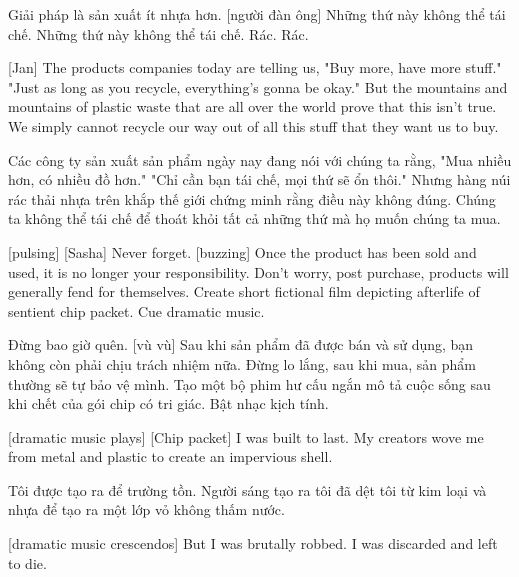 \documentclass[a4paper]{article}
\begin{document}
	\begin{vietnamese-v2}
		 Giải pháp là sản xuất ít nhựa hơn.
		[người đàn ông] Những thứ này không thể tái chế.
		Những thứ này không thể tái chế. Rác. Rác.
	\end{vietnamese-v2}
	
	[Jan] The products companies today are telling us,
	"Buy more, have more stuff."
	"Just as long as you recycle, everything's gonna be okay."
	But the mountains and mountains of plastic waste that are all over the world prove that this isn't true.
	We simply cannot recycle our way out of all this stuff that they want us to buy.
	
	\begin{vietnamese-v2}
		[Jan] Các công ty sản xuất sản phẩm ngày nay đang nói với chúng ta rằng,
		"Mua nhiều hơn, có nhiều đồ hơn."
		"Chỉ cần bạn tái chế, mọi thứ sẽ ổn thôi."
		Nhưng hàng núi rác thải nhựa trên khắp thế giới chứng minh rằng điều này không đúng.
		Chúng ta không thể tái chế để thoát khỏi tất cả những thứ mà họ muốn chúng ta mua.
	\end{vietnamese-v2}
	
	
	[pulsing]
	[Sasha] Never forget.
	[buzzing]
	Once the product has been sold and used, it is no longer your responsibility.
	Don't worry, post purchase, products will generally fend for themselves.
	Create short fictional film depicting afterlife of sentient chip packet.
	Cue dramatic music.
	
	\begin{vietnamese-v2}
		[đập]
		[Sasha] Đừng bao giờ quên.
		[vù vù]
		Sau khi sản phẩm đã được bán và sử dụng, bạn không còn phải chịu trách nhiệm nữa.
		Đừng lo lắng, sau khi mua, sản phẩm thường sẽ tự bảo vệ mình.
		Tạo một bộ phim hư cấu ngắn mô tả cuộc sống sau khi chết của gói chip có tri giác.
		Bật nhạc kịch tính.
	\end{vietnamese-v2}
	
	[dramatic music plays]
	[Chip packet] I was built to last.
	My creators wove me from metal and plastic to create an impervious shell.
	
	\begin{vietnamese-v2}
		 Tôi được tạo ra để trường tồn.
		Người sáng tạo ra tôi đã dệt tôi từ kim loại và nhựa để tạo ra một lớp vỏ không thấm nước.
	\end{vietnamese-v2}
	
	[dramatic music crescendos]
	But I was brutally robbed.
	I was discarded and left to die.
	
\end{document}
